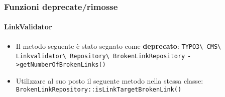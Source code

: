 %
%
%
%
%
%
%
%
%

\begin{frame}[fragile]
	\frametitle{Funzioni deprecate/rimosse}
	\framesubtitle{LinkValidator}

	\begin{itemize}
		\item Il metodo seguente è stato segnato come \textbf{deprecato}:
		\newline\newline
			\smaller
				\texttt{TYPO3\textbackslash
					CMS\textbackslash
					Linkvalidator\textbackslash
					Repository\textbackslash
					BrokenLinkRepository}\newline
				\texttt{->getNumberOfBrokenLinks()}\normalsize\newline

		\item Utilizzare al suo posto il seguente metodo nella stessa classe:\newline
			\small\texttt{BrokenLinkRepository::isLinkTargetBrokenLink()}\normalsize

	\end{itemize}

\end{frame}


